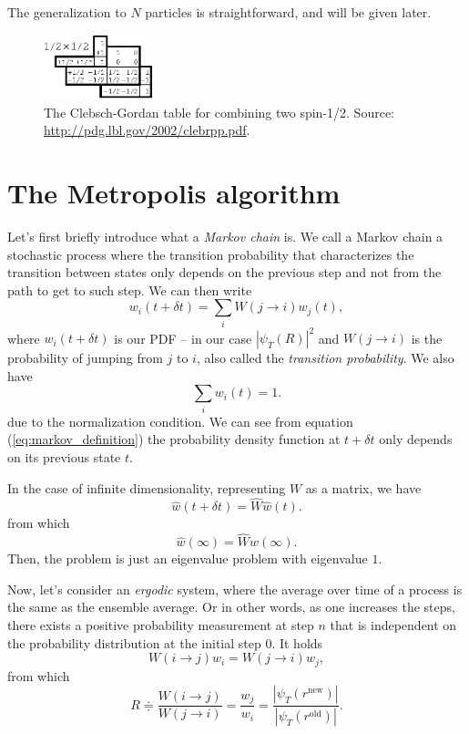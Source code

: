 \documentclass[a4paper,twoside,11pt]{book}
\begin{document}
The generalization to $N$ particles is straightforward, and will be given later.

\begin{figure}[H]
	\centering
	\includegraphics[width=0.28\textwidth]{CGt}
	\caption{The Clebsch-Gordan table for combining two spin-1/2. Source: \url{http://pdg.lbl.gov/2002/clebrpp.pdf}.}
	\label{fig:CGt}
\end{figure}

\section{The Metropolis algorithm}

Let's first briefly introduce what a \emph{Markov chain} is. We call a Markov chain a stochastic process where the transition probability that characterizes the transition between states only depends on the previous step and not from the path to get to such step. We can then write \citep[see][]{Hjorth-Jensen2014}
\begin{equation}
	w_i(t+\delta t)=\sum_i W(j \rightarrow i) w_j (t),
	\label{eq:markov_definition}
\end{equation}
where $w_i(t+\delta t)$ is our PDF -- in our case $|\psi_T(R)|^2$ and $W(j \rightarrow i)$ is the probability of jumping from $j$ to $i$, also called the \emph{transition probability}. We also have
\begin{equation}
	\sum_{i}w_i(t) = 1.
\end{equation}
due to the normalization condition. We can see from equation (\ref{eq:markov_definition}) the probability density function at $t+\delta t$ only depends on its previous state $t$. 

In the case of infinite dimensionality, representing $W$ as a matrix, we have
\begin{equation}
	\hat{w}(t+\delta t) = \hat{W}\hat{w}(t).
\end{equation}
from which
\begin{equation}
	\hat{w}(\infty)= \hat{W} \hat{w}(\infty).
\end{equation}
Then, the problem is just an eigenvalue problem with eigenvalue $1$.

Now, let's consider an \emph{ergodic} system, where the average over time of a process is the same as the ensemble average. Or in other words, as one increases the steps, there exists a positive probability measurement at step $n$ that is independent on the probability distribution at the initial step $0$. It holds
\begin{equation}
	W(i \rightarrow j) w_i= W(j \rightarrow i) w_j,
\end{equation}
from which
\begin{equation}
	R \doteqdot \frac{W(i \rightarrow j)}{W(j \rightarrow i)}=\frac{w_j}{w_i}=\frac{|\psi_T (r^{\text{new}})|}{|\psi_T (r^{\text{old}})|}.
\end{equation}
\end{document}
